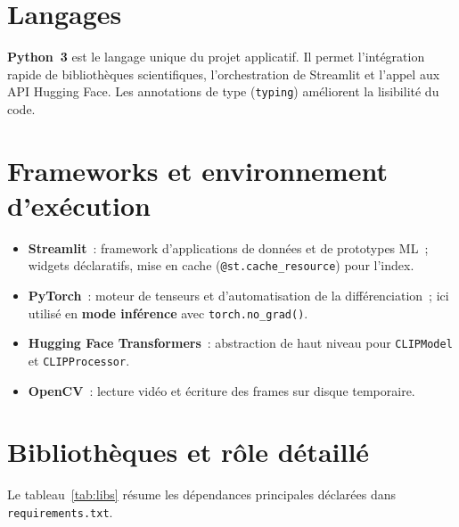\documentclass[11pt,a4paper,openany]{report}
\begin{document}
\section{Langages}

\textbf{Python~3} est le langage unique du projet applicatif. Il permet l'intégration rapide de bibliothèques scientifiques, l'orchestration de Streamlit et l'appel aux API Hugging Face. Les annotations de type (\texttt{typing}) améliorent la lisibilité du code.

\section{Frameworks et environnement d'exécution}

\begin{itemize}[leftmargin=*]
  \item \textbf{Streamlit}~: framework d'applications de données et de prototypes ML~; widgets déclaratifs, mise en cache (\texttt{@st.cache\_resource}) pour l'index.
  \item \textbf{PyTorch}~: moteur de tenseurs et d'automatisation de la différenciation~; ici utilisé en \textbf{mode inférence} avec \texttt{torch.no\_grad()}.
  \item \textbf{Hugging Face Transformers}~: abstraction de haut niveau pour \texttt{CLIPModel} et \texttt{CLIPProcessor}.
  \item \textbf{OpenCV}~: lecture vidéo et écriture des frames sur disque temporaire.
\end{itemize}

\section{Bibliothèques et rôle détaillé}

Le tableau~\ref{tab:libs} résume les dépendances principales déclarées dans \texttt{requirements.txt}.
\end{document}
